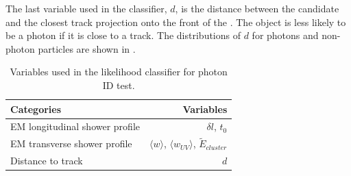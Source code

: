 The last variable used in the classifier, $d$, is the distance between the candidate and the closest track projection onto the front of the \ECAL. The \ShowerPeak object is less likely to be a photon if it is close to a track. The distributions of $d$ for photons and non-photon particles are shown in .


\begin{table}[htbp] \centering \smallskip
\begin{tabular}{l r }
\hline
\hline
Categories&  Variables\\
\hline
EM longitudinal  shower profile & $\delta{l}$, $t_0$ \\
EM transverse  shower profile & $\langle{w}\rangle$, ${\langle{w_{UV}}\rangle}$, $\tilde{E}_{cluster}$ \\
Distance to track &  $d$ \\
\hline
\hline
\end{tabular}
\caption
{Variables used in the likelihood classifier for photon ID test.}
\label{tab:photonPhotonIDvar}
\end{table}

